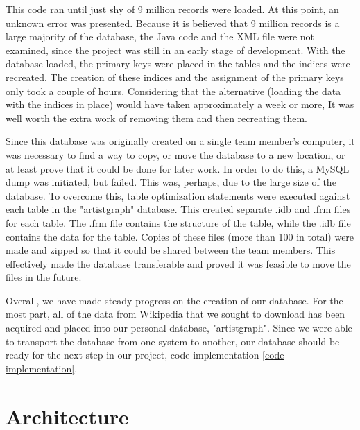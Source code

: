 \documentclass{sig-alternate}
\begin{document}
This code ran until just shy of 9 million records were loaded. At this point, an unknown error
was presented. Because it is believed that 9 million records is a large majority of the
database, the Java code and the XML file were not examined, since the project was still in an early stage of development. 
With the database loaded, the primary keys were placed in the tables and the indices were recreated.  
The creation of these indices and the assignment of the primary keys only took a couple of hours. 
Considering that the alternative (loading the data with the indices in place) would have taken approximately a week or more,
It was well worth the extra work of removing them and then recreating them.
 
Since this database was originally created on a single team member's computer, it was necessary to find a way to copy, 
or move the database to a new location, or at least prove that it could be done for later work.
In order to do this, a MySQL dump was initiated, but failed. This was, perhaps, due to the large size of the database. 
To overcome this, table optimization statements were executed against each table in the "artistgraph" database. 
This created separate .idb and .frm files for each table. The .frm file contains the structure of the table, while the 
.idb file contains the data for the table. Copies of these files (more than 100 in total) were made and zipped so that it could 
be shared between the team members. This effectively made the database transferable and proved it was feasible to move the files in the future.
 

Overall, we have made steady progress on the creation of our database. For the most part, 
all of the data from Wikipedia that we sought to download has been acquired and placed into
our personal database, "artistgraph". Since we were able to transport the database from one system to another, 
our database should be ready for the next step in our project, code implementation
\ref{code implementation}. 

\section{Architecture}
\label{architecture}
\end{document}
